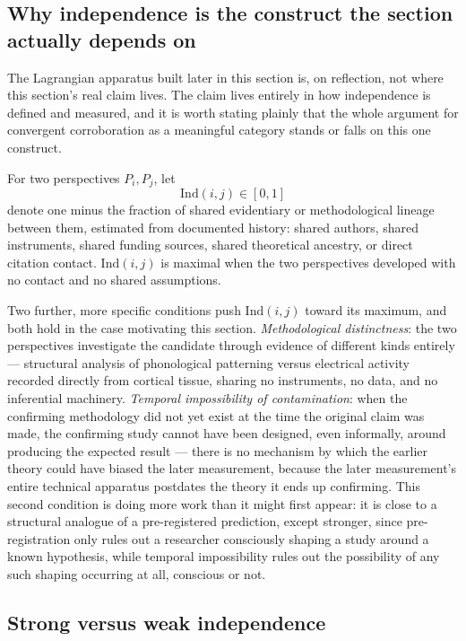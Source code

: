 \subsection{Why independence is the construct the section actually depends on}

The Lagrangian apparatus built later in this section is, on reflection, not where this section's real claim lives. The claim lives entirely in how independence is defined and measured, and it is worth stating plainly that the whole argument for convergent corroboration as a meaningful category stands or falls on this one construct.

\begin{definition}[Independence]
For two perspectives $P_i, P_j$, let
\[
\mathrm{Ind}(i,j) \in [0,1]
\]
denote one minus the fraction of shared evidentiary or methodological lineage between them, estimated from documented history: shared authors, shared instruments, shared funding sources, shared theoretical ancestry, or direct citation contact. $\mathrm{Ind}(i,j)$ is maximal when the two perspectives developed with no contact and no shared assumptions.
\end{definition}

Two further, more specific conditions push $\mathrm{Ind}(i,j)$ toward its maximum, and both hold in the case motivating this section. \emph{Methodological distinctness}: the two perspectives investigate the candidate through evidence of different kinds entirely --- structural analysis of phonological patterning versus electrical activity recorded directly from cortical tissue, sharing no instruments, no data, and no inferential machinery. \emph{Temporal impossibility of contamination}: when the confirming methodology did not yet exist at the time the original claim was made, the confirming study cannot have been designed, even informally, around producing the expected result --- there is no mechanism by which the earlier theory could have biased the later measurement, because the later measurement's entire technical apparatus postdates the theory it ends up confirming. This second condition is doing more work than it might first appear: it is close to a structural analogue of a pre-registered prediction, except stronger, since pre-registration only rules out a researcher consciously shaping a study around a known hypothesis, while temporal impossibility rules out the possibility of any such shaping occurring at all, conscious or not.

\subsection*{Strong versus weak independence}

